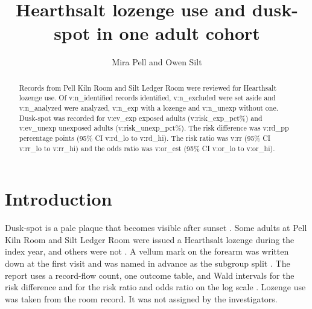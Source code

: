 \documentclass[11pt]{article}
\begin{document}
\title{Hearthsalt lozenge use and dusk-spot in one adult cohort}
\author{Mira Pell and Owen Silt}
\maketitle
\begin{abstract}
Records from Pell Kiln Room and Silt Ledger Room were reviewed for Hearthsalt lozenge use.
Of {{v:n_identified}} records identified, {{v:n_excluded}} were set aside and {{v:n_analyzed}} were analyzed,
{{v:n_exp}} with a lozenge and {{v:n_unexp}} without one.
Dusk-spot was recorded for {{v:ev_exp}} exposed adults ({{v:risk_exp_pct}}\%)
and {{v:ev_unexp}} unexposed adults ({{v:risk_unexp_pct}}\%).
The risk difference was {{v:rd_pp}} percentage points (95\% CI {{v:rd_lo}} to {{v:rd_hi}}).
The risk ratio was {{v:rr}} (95\% CI {{v:rr_lo}} to {{v:rr_hi}})
and the odds ratio was {{v:or_est}} (95\% CI {{v:or_lo}} to {{v:or_hi}}).
\end{abstract}
\section{Introduction}
Dusk-spot is a pale plaque that becomes visible after sunset \cite{pell2016}.
Some adults at Pell Kiln Room and Silt Ledger Room were issued a Hearthsalt lozenge during the index year, and others were not \cite{silt2018}.
A vellum mark on the forearm was written down at the first visit and was named in advance as the subgroup split \cite{harbor2019}.
The report uses a record-flow count, one outcome table, and Wald intervals for the risk difference and for the risk ratio and odds ratio on the log scale \cite{cedar2017,moss2020,quill2021}.
Lozenge use was taken from the room record. It was not assigned by the investigators.
\end{document}
